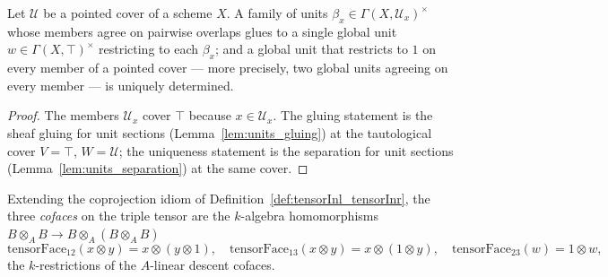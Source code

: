 \begin{theorem}
  \label{thm:exists_global_unit_of_compatible}
  \leanok
  Let \(\mathcal U\) be a pointed cover of a scheme \(X\).  A family of units \(\beta_x \in
  \Gamma(X, \mathcal U_x)^{\times}\) whose members agree on pairwise overlaps glues to a single
  global unit \(w \in \Gamma(X, \top)^{\times}\) restricting to each \(\beta_x\); and a global
  unit that restricts to \(1\) on every member of a pointed cover — more precisely, two global
  units agreeing on every member — is uniquely determined.
\end{theorem}
\begin{proof}
  \leanok
  The members \(\mathcal U_x\) cover \(\top\) because \(x \in \mathcal U_x\).  The gluing
  statement is the sheaf gluing for unit sections (Lemma~\ref{lem:units_gluing}) at the
  tautological cover \(V = \top\), \(W = \mathcal U\); the uniqueness statement is the
  separation for unit sections (Lemma~\ref{lem:units_separation}) at the same cover.
\end{proof}

\begin{definition}
  \label{def:tensorFaces}
  \leanok
  Extending the coprojection idiom of Definition~\ref{def:tensorInl_tensorInr}, the three
  \emph{cofaces} on the triple tensor are the \(k\)-algebra homomorphisms \(B \otimes_A B \to B
  \otimes_A (B \otimes_A B)\)
  \[
    \mathrm{tensorFace}_{12}(x \otimes y) = x \otimes (y \otimes 1), \quad
    \mathrm{tensorFace}_{13}(x \otimes y) = x \otimes (1 \otimes y), \quad
    \mathrm{tensorFace}_{23}(w) = 1 \otimes w,
  \]
  the \(k\)-restrictions of the \(A\)-linear descent cofaces.
\end{definition}

